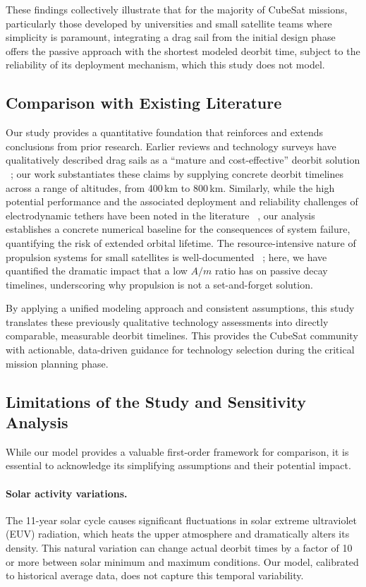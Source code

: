 \documentclass[11pt,a4paper]{article}
\begin{document}
These findings collectively illustrate that for the majority of CubeSat missions, particularly those developed by universities and small satellite teams where simplicity is paramount, integrating a drag sail from the initial design phase offers the passive approach with the shortest modeled deorbit time, subject to the reliability of its deployment mechanism, which this study does not model.

\subsection{Comparison with Existing Literature}
Our study provides a quantitative foundation that reinforces and extends conclusions from prior research. Earlier reviews and technology surveys have qualitatively described drag sails as a ``mature and cost-effective'' deorbit solution ~\cite{visagie,altaf}; our work substantiates these claims by supplying concrete deorbit timelines across a range of altitudes, from 400\,km to 800\,km. Similarly, while the high potential performance and the associated deployment and reliability challenges of electrodynamic tethers have been noted in the literature ~\cite{sanchez,sarego}, our analysis establishes a concrete numerical baseline for the consequences of system failure, quantifying the risk of extended orbital lifetime. The resource-intensive nature of propulsion systems for small satellites is well-documented ~\cite{lemmer,selva}; here, we have quantified the dramatic impact that a low $A/m$ ratio has on passive decay timelines, underscoring why propulsion is not a set-and-forget solution.

By applying a unified modeling approach and consistent assumptions, this study translates these previously qualitative technology assessments into directly comparable, measurable deorbit timelines. This provides the CubeSat community with actionable, data-driven guidance for technology selection during the critical mission planning phase.

\subsection{Limitations of the Study and Sensitivity Analysis}
While our model provides a valuable first-order framework for comparison, it is essential to acknowledge its simplifying assumptions and their potential impact.

\paragraph{Solar activity variations.} The 11-year solar cycle causes significant fluctuations in solar extreme ultraviolet (EUV) radiation, which heats the upper atmosphere and dramatically alters its density. This natural variation can change actual deorbit times by a factor of 10 or more between solar minimum and maximum conditions. Our model, calibrated to historical average data, does not capture this temporal variability.
\end{document}
